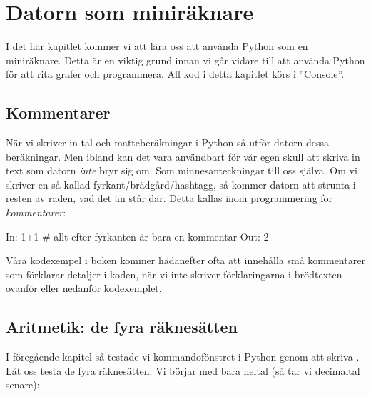 %
%

\chapter{Datorn som miniräknare}\label{ch:datorn_som_raknemaskin}

I det här kapitlet kommer vi att lära oss att använda Python som en miniräknare. Detta är en viktig grund innan vi går vidare till att använda Python för att rita grafer och programmera. All kod i detta kapitlet körs i ''Console''.


\section{Kommentarer}

När vi skriver in tal och matteberäkningar i Python så utför datorn dessa beräkningar. Men ibland kan det vara användbart för vår egen skull att skriva in text som datorn \emph{inte} bryr sig om. Som minnesanteckningar till oss själva. Om vi skriver en så kallad fyrkant/brädgård/hashtagg, \cw{\#} så kommer datorn att strunta i resten av raden, vad det än står där. Detta kallas inom programmering för \emph{kommentarer}:

\begin{python}[caption={Vår första kommentar},label={}]
In: 1+1 # allt efter fyrkanten är bara en kommentar
Out: 2
\end{python}

Våra kodexempel i boken kommer hädanefter ofta att innehålla små kommentarer som förklarar detaljer i koden, när vi inte skriver förklaringarna i brödtexten ovanför eller nedanför kodexemplet.
\newpage
\section{Aritmetik: de fyra räknesätten}
I föregående kapitel så testade vi kommandofönstret i Python genom att skriva . Låt oss testa de fyra räknesätten. Vi börjar med bara heltal (så tar vi decimaltal senare):

